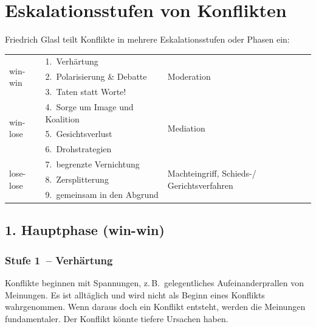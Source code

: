 \section{Eskalationsstufen von Konflikten}
\label{eskalationsstufen}

Friedrich Glasl \cite{glasl-konfliktmanegement} teilt Konflikte in mehrere Eskalationsstufen oder Phasen ein:

\vspace{1em}

\begin{tabular}{ l l l }
    \multirow{3}{5em}{win-win}   & 1.~Verhärtung                   & \multirow{3}{5em}{Moderation}                                 \\
    & 2.~Polarisierung \& Debatte     \\
    & 3.~Taten statt Worte! \\ \hline
    \multirow{3}{5em}{win-lose}  & 4.~Sorge um Image und Koalition & \multirow{3}{5em}{Mediation}                                  \\
    & 5.~Gesichtsverlust              &                                                               \\
    & 6.~Drohstrategien               &                                                               \\ \hline
    \multirow{3}{5em}{lose-lose} & 7.~begrenzte Vernichtung        & \multirow{3}{5em}{Machteingriff, Schieds-/ Gerichtsverfahren} \\
    & 8.~Zersplitterung               &                                                               \\
    & 9.~gemeinsam in den Abgrund     &                                                               \\
\end{tabular}

\subsection{1. Hauptphase (win-win)}

\subsubsection{Stufe 1~-- Verhärtung}

Konflikte beginnen mit Spannungen, z.\,B.~gelegentliches Aufeinanderprallen von Meinungen. Es ist alltäglich und wird nicht als Beginn eines Konflikts wahrgenommen. Wenn daraus doch ein Konflikt entsteht, werden die Meinungen fundamentaler. Der Konflikt könnte tiefere Ursachen haben.

